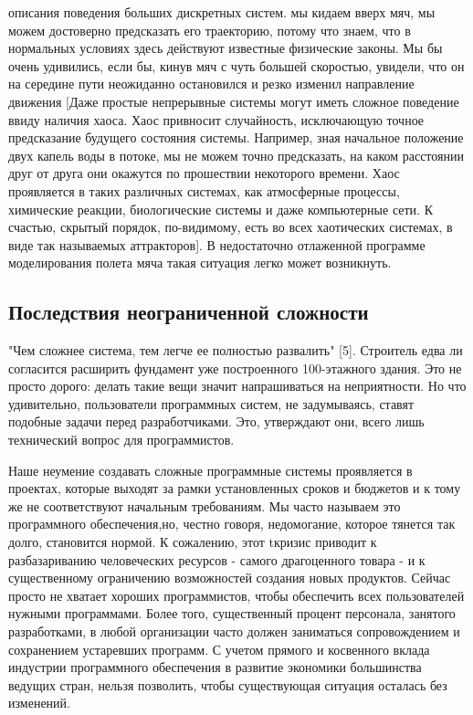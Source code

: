 \documentclass[11pt]{article}
\begin{document}
 описания поведения больших дискретных систем.  мы кидаем вверх мяч, мы можем достоверно предсказать его траекторию, потому что знаем, что в нормальных условиях здесь действуют известные физические законы. Мы бы очень удивились, если бы, кинув мяч с чуть большей скоростью, увидели, что он на середине пути неожиданно остановился и резко изменил направление движения [Даже простые непрерывные системы могут иметь сложное поведение ввиду наличия хаоса. Хаос привносит случайность, исключающую точное предсказание будущего состояния системы. Например, зная начальное положение двух капель воды в потоке, мы не можем точно предсказать, на каком расстоянии друг от друга они окажутся по прошествии некоторого времени. Хаос проявляется в таких различных системах, как атмосферные процессы, химические реакции, биологические системы и даже компьютерные сети. К счастью, скрытый порядок, по-видимому, есть во всех хаотических системах, в виде так называемых аттракторов]. В недостаточно отлаженной программе моделирования полета мяча такая ситуация легко может возникнуть. 

\subsection{Последствия неограниченной сложности }
"Чем сложнее система, тем легче ее полностью развалить" [5]. Строитель едва ли согласится расширить фундамент уже построенного 100-этажного здания. Это не просто дорого: делать такие вещи значит напрашиваться на неприятности. Но что удивительно, пользователи программных систем, не задумываясь, ставят подобные задачи перед разработчиками. Это, утверждают они, всего лишь технический вопрос для программистов. \bigskip

Наше неумение создавать сложные программные системы проявляется в проектах, которые выходят за рамки установленных сроков и бюджетов и к тому же не соответствуют начальным требованиям. Мы часто называем это  программного обеспечения,\rm но, честно говоря, недомогание, которое тянется так долго, становится нормой. К сожалению, этот tкризис приводит к разбазариванию человеческих ресурсов - самого драгоценного товара - и к существенному ограничению возможностей создания новых продуктов. Сейчас просто не хватает хороших программистов, чтобы обеспечить всех пользователей нужными программами. Более того, существенный процент персонала, занятого разработками, в любой организации часто должен заниматься сопровождением и сохранением устаревших программ. С учетом прямого и косвенного вклада индустрии программного обеспечения в развитие экономики большинства ведущих стран, нельзя позволить, чтобы существующая ситуация осталась без изменений.\bigskip 
\end{document}
